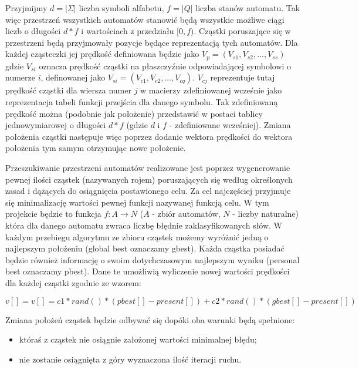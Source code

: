 \documentclass{mini}
\begin{document}
Przyjmijmy $d = |\Sigma|$ liczba symboli alfabetu, $f = |Q|$ liczba stanów automatu. Tak więc przestrzeń wszystkich automatów stanowić będą wszystkie możliwe ciągi liczb o długości $d*f$ i wartościach z przedziału $[0, f)$. Cząstki poruszające się w przestrzeni będą przyjmowały pozycje będące reprezentacją tych automatów. Dla każdej cząsteczki jej prędkość definiowana będzie jako $V_{p} = (V_{s1}, V_{s2}, …, V_{ss})$ gdzie $V_{si}$ oznacza prędkość cząstki na płaszczyźnie odpowiadającej symbolowi o numerze $i$, definowanej jako $V_{si} = (V_{c1}, V_{c2}, …, V_{cq})$. $V_{cj}$ reprezentuje tutaj prędkość cząstki dla wiersza numer $j$ w macierzy zdefiniowanej wcześnie jako reprezentacja tabeli funkcji przejścia dla danego symbolu. Tak zdefiniowaną prędkość można (podobnie jak położenie) przedstawić w postaci tablicy jednowymiarowej o długości $d*f$ (gdzie $d$ i $f$ - zdefiniowane wcześniej). Zmiana położenia cząstki następuje więc poprzez dodanie wektora prędkości do wektora położenia tym samym otrzymując nowe położenie.

Przeszukiwanie przestrzeni automatów realizowane jest poprzez wygenerowanie pewnej ilości cząstek (nazywanych rojem) poruszających się według określonych zasad i dążących do osiągnięcia postawionego celu. Za cel najczęściej przyjmuje się minimalizację wartości pewnej funkcji nazywanej funkcją celu. W tym projekcie będzie to funkcja $f:A \rightarrow N$ ($A$ - zbiór automatów, $N$ - liczby naturalne) która dla danego automatu zwraca liczbę błędnie zaklasyfikowanych słów. W każdym przebiegu algorytmu ze zbioru cząstek możemy wyróżnić jedną o najlepszym położeniu (global best oznaczamy gbest). Każda cząstka posiadać będzie również informację o swoim dotychczasowym najlepszym wyniku (personal best oznaczamy pbest). Dane te umożliwią wyliczenie nowej wartości prędkości dla każdej cząstki zgodnie ze wzorem: 

\begin{center}
$v[] = v[] = c1 * rand() * (pbest[] - present[]) + c2 * rand() * (gbest[] - present[])$
\end{center}

Zmiana położeń cząstek będzie odbywać się dopóki oba warunki będą spełnione:

\begin{itemize}
	\item któraś z cząstek nie osiągnie założonej wartości minimalnej błędu;
	\item nie zostanie osiągnięta z góry wyznaczona ilość iteracji ruchu.
\end{itemize}
\end{document}
